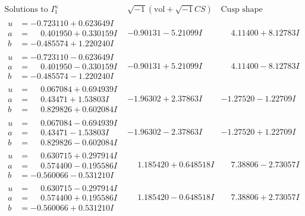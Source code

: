 \documentclass[1p]{elsarticle_modified}
\theoremstyle{definition}
\newcommand{\I}{\sqrt{-1}}
\begin{document}
$$\begin{array}{c|c|c}  
\text{Solutions to }I^u_{1}& \I (\text{vol} + \sqrt{-1}CS) & \text{Cusp shape}\\
 \hline 
\begin{aligned}
u &= -0.723110 + 0.623649 I \\
a &= \phantom{-}0.401950 + 0.330159 I \\
b &= -0.485574 + 1.220240 I\end{aligned}
 & -0.90131 - 5.21099 I & \phantom{-}4.11400 + 8.12783 I \\ \hline\begin{aligned}
u &= -0.723110 - 0.623649 I \\
a &= \phantom{-}0.401950 - 0.330159 I \\
b &= -0.485574 - 1.220240 I\end{aligned}
 & -0.90131 + 5.21099 I & \phantom{-}4.11400 - 8.12783 I \\ \hline\begin{aligned}
u &= \phantom{-}0.067084 + 0.694939 I \\
a &= \phantom{-}0.43471 + 1.53803 I \\
b &= \phantom{-}0.829826 + 0.602084 I\end{aligned}
 & -1.96302 + 2.37863 I & -1.27520 - 1.22709 I \\ \hline\begin{aligned}
u &= \phantom{-}0.067084 - 0.694939 I \\
a &= \phantom{-}0.43471 - 1.53803 I \\
b &= \phantom{-}0.829826 - 0.602084 I\end{aligned}
 & -1.96302 - 2.37863 I & -1.27520 + 1.22709 I \\ \hline\begin{aligned}
u &= \phantom{-}0.630715 + 0.297914 I \\
a &= \phantom{-}0.574400 - 0.195586 I \\
b &= -0.560066 - 0.531210 I\end{aligned}
 & \phantom{-}1.185420 + 0.648518 I & \phantom{-}7.38806 - 2.73057 I \\ \hline\begin{aligned}
u &= \phantom{-}0.630715 - 0.297914 I \\
a &= \phantom{-}0.574400 + 0.195586 I \\
b &= -0.560066 + 0.531210 I\end{aligned}
 & \phantom{-}1.185420 - 0.648518 I & \phantom{-}7.38806 + 2.73057 I \\ \hline\begin{aligned}

\end{aligned}
\end{array}$$
\end{document}
